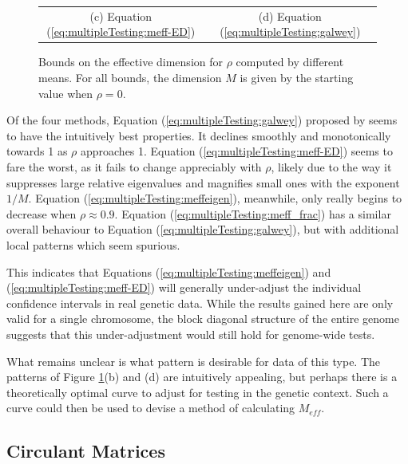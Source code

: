 \documentclass[letterpaper,12pt,oneside,final]{article}
\begin{document}
\begin{figure}[htp]
\begin{center}
\begin{tabular}{cc}
{\footnotesize (c) Equation (\ref{eq:multipleTesting:meff-ED})}& {\footnotesize (d) Equation (\ref{eq:multipleTesting:galwey})} \\
\end{tabular}
\end{center}
\caption{Bounds on the effective dimension for $\rho$ computed by different means. For all bounds, the dimension $M$ is given by the starting value when $\rho = 0$.}
\label{fig:multipleTesting:MeffBounds}
\end{figure}

Of the four methods, Equation (\ref{eq:multipleTesting:galwey}) proposed by \cite{Galwey2009} seems to have the intuitively best properties. It declines smoothly and monotonically towards 1 as $\rho$ approaches 1. Equation (\ref{eq:multipleTesting:meff-ED}) seems to fare the worst, as it fails to change appreciably with $\rho$, likely due to the way it suppresses large relative eigenvalues and magnifies small ones with the exponent $1/M$. Equation (\ref{eq:multipleTesting:meffeigen}), meanwhile, only really begins to decrease when $\rho \approx 0.9$. Equation (\ref{eq:multipleTesting:meff_frac}) has a similar overall behaviour to Equation (\ref{eq:multipleTesting:galwey}), but with additional local patterns which seem spurious.

This indicates that Equations (\ref{eq:multipleTesting:meffeigen}) and (\ref{eq:multipleTesting:meff-ED}) will generally under-adjust the individual confidence intervals in real genetic data. While the results gained here are only valid for a single chromosome, the block diagonal structure of the entire genome suggests that this under-adjustment would still hold for genome-wide tests.

What remains unclear is what pattern is desirable for data of this type. The patterns of Figure \ref{fig:multipleTesting:MeffBounds}(b) and (d) are intuitively appealing, but perhaps there is a theoretically optimal curve to adjust for testing in the genetic context. Such a curve could then be used to devise a method of calculating $M_{eff}$.

\subsection{Circulant Matrices} \label{c:multipleTesting:circDecom}
\end{document}
